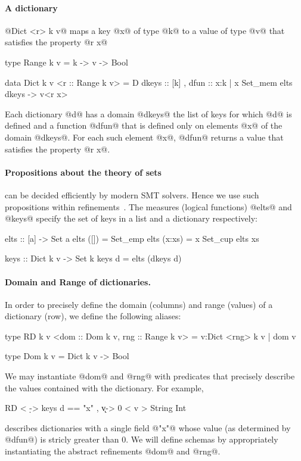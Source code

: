 \paragraph{A dictionary} @Dict <r> k v@ maps a key @x@ of 
type @k@ to a value of type @v@ that satisfies the property @r x@
%
\begin{code}
  type Range k v = k -> v -> Bool
   
  data Dict k v <r :: Range k v> = D {
      dkeys :: [k]
    , dfun  :: x:{k | x Set_mem elts dkeys} -> v<r x>
    }
\end{code}      
%
Each dictionary @d@ has a domain @dkeys@ 
\ie the list of keys for which @d@ is defined 
and a function @dfun@ that is defined only on
elements @x@ of the domain @dkeys@.
%
For each such element @x@, @dfun@ returns a value that satisfies the
property @r x@.

\paragraph{Propositions about the theory of sets} can be decided
efficiently by modern SMT solvers. Hence we use such 
propositions within refinements~\citep{realworldliquid}.
% 
The measures (logical functions) @elts@ and @keys@ 
specify the set of keys in a list and a dictionary 
respectively:
%
\begin{code}
  elts        :: [a] -> Set a
  elts ([])   = Set_emp
  elts (x:xs) = {x} Set_cup elts xs

  keys        :: Dict k v -> Set k
  keys d      = elts (dkeys d) 
\end{code}

\paragraph{Domain and Range of dictionaries.}
%
In order to precisely define the domain (\eg columns) and range (\eg values)
of a dictionary (\eg row), we define the following aliases:
%
\begin{code}
  type RD k v <dom :: Dom k v, rng :: Range k v>
    = {v:Dict <rng> k v | dom v}

  type Dom k v = Dict k v -> Bool 
\end{code}
%
We may instantiate @dom@ and @rng@ with predicates that precisely describe
the values contained with the dictionary.
%
For example,
%
\begin{code}
  RD < \d -> keys d == {"x"}
     , \k v-> 0 < v         > String Int
\end{code}
%
%
describes dictionaries with a single field @"x"@ 
whose value (as determined by @dfun@) is stricly 
greater than 0.
%
We will define schemas by appropriately 
instantiating the abstract refinements 
@dom@ and @rng@.


